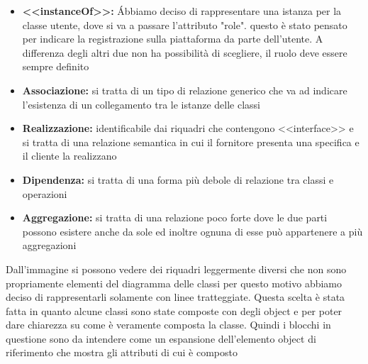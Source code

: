 \documentclass[a4paper, 11pt,oneside]{book}
\newcommand{\spacing}{\par\bigskip\noindent}
\begin{document}
    \begin{itemize}
        \item \textbf{<<instanceOf>>:} \'Abbiamo deciso di rappresentare una istanza per la classe utente, dove si va a passare l'attributo "role". questo
              è stato pensato per indicare la registrazione sulla piattaforma da parte dell'utente. A differenza degli altri due non ha possibilità di scegliere, il ruolo deve essere sempre definito
        \item \textbf{Associazione:} si tratta di un tipo di relazione generico che va ad indicare l'esistenza di un collegamento tra le istanze delle classi
        \item \textbf{Realizzazione:} identificabile dai riquadri che contengono <<interface>> e si tratta di una relazione semantica in cui il fornitore presenta una specifica e il cliente la realizzano
        \item \textbf{Dipendenza:} si tratta di una forma più debole di relazione tra classi e operazioni
        \item \textbf{Aggregazione:} si tratta di una relazione poco forte dove le due parti possono esistere anche da sole ed inoltre ognuna di esse può appartenere a più aggregazioni
    \end{itemize}
    \spacing
    Dall'immagine si possono vedere dei riquadri leggermente diversi che non sono propriamente elementi del diagramma delle classi per questo motivo abbiamo deciso di rappresentarli solamente con linee tratteggiate.
    Questa scelta è stata fatta in quanto alcune classi sono state composte con degli object e per poter dare chiarezza su come è veramente composta la classe. Quindi i blocchi in questione sono da intendere come un espansione
    dell'elemento object di riferimento che mostra gli attributi di cui è composto


\end{document}
